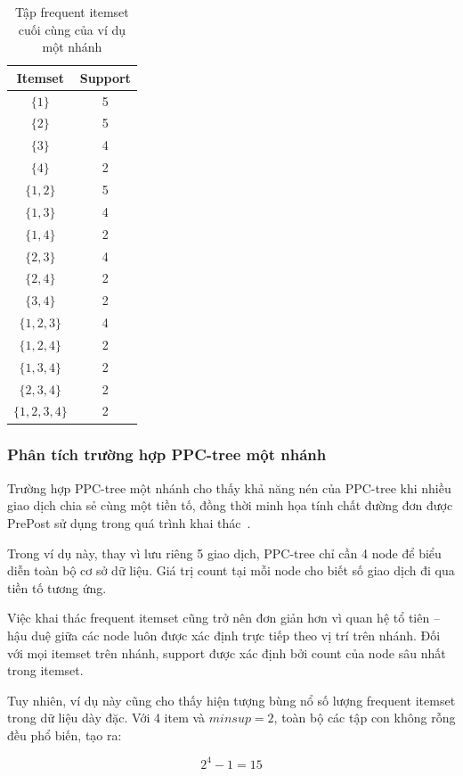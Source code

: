 \begin{table}[H]
\centering
\caption{Tập frequent itemset cuối cùng của ví dụ một nhánh}
\label{tab:special-final-fi}
\begin{tabular}{cc}
\toprule
Itemset & Support \\
\midrule
$\{1\}$ & 5 \\
$\{2\}$ & 5 \\
$\{3\}$ & 4 \\
$\{4\}$ & 2 \\
$\{1,2\}$ & 5 \\
$\{1,3\}$ & 4 \\
$\{1,4\}$ & 2 \\
$\{2,3\}$ & 4 \\
$\{2,4\}$ & 2 \\
$\{3,4\}$ & 2 \\
$\{1,2,3\}$ & 4 \\
$\{1,2,4\}$ & 2 \\
$\{1,3,4\}$ & 2 \\
$\{2,3,4\}$ & 2 \\
$\{1,2,3,4\}$ & 2 \\
\bottomrule
\end{tabular}
\end{table}

\subsubsection{Phân tích trường hợp PPC-tree một nhánh}

Trường hợp PPC-tree một nhánh cho thấy khả năng nén của PPC-tree khi nhiều
giao dịch chia sẻ cùng một tiền tố, đồng thời minh họa tính chất đường đơn được
PrePost sử dụng trong quá trình khai thác~\cite{deng2012prepost}.

Trong ví dụ này, thay vì lưu riêng 5 giao dịch, PPC-tree chỉ cần 4 node để biểu diễn toàn bộ cơ sở dữ liệu. Giá trị count tại mỗi node cho biết số giao dịch đi qua tiền tố tương ứng.

Việc khai thác frequent itemset cũng trở nên đơn giản hơn vì quan hệ tổ tiên -- hậu duệ giữa các node luôn được xác định trực tiếp theo vị trí trên nhánh. Đối với mọi itemset trên nhánh, support được xác định bởi count của node sâu nhất trong itemset.

Tuy nhiên, ví dụ này cũng cho thấy hiện tượng bùng nổ số lượng frequent itemset trong dữ liệu dày đặc. Với 4 item và $\mathit{minsup}=2$, toàn bộ các tập con không rỗng đều phổ biến, tạo ra:

\begin{equation}
    2^4-1=15
\end{equation}

